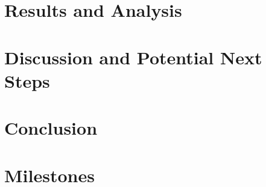 \documentclass[12pt,fleqn,a4paper]{article}
\begin{document}
\section{Results and Analysis}

\section{Discussion and Potential Next Steps}

\section{Conclusion}

\newpage

\section{Milestones} %
\end{document}
